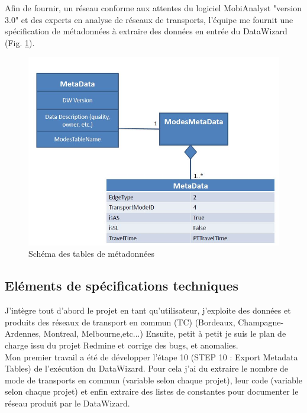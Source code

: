 \begin{itemize}
Afin de fournir, un réseau conforme aux attentes du logiciel MobiAnalyst "version 3.0" et des experts en analyse de réseaux de transports, l'équipe me fournit une spécification de métadonnées à extraire des données en entrée du DataWizard (Fig. \ref{DW_Metadata}).\\

\begin{figure}[!h]
\centering
\includegraphics[width=14cm]{images/DW_specMetadata.JPG}
\caption{\label{DW_Metadata}Schéma des tables de métadonnées}
\end{figure} 

\subsection{Eléments de spécifications techniques}

J'intègre tout d'abord le projet en tant qu'utilisateur, j'exploite des données et produits des réseaux de transport en commun (TC) (Bordeaux, Champagne-Ardennes, Montreal, Melbourne,etc...) Ensuite, petit à petit je suis le plan de charge issu du projet Redmine et corrige des bugs, et anomalies.\\

Mon premier travail a été de développer l'étape 10 (STEP 10 : Export Metadata Tables) de l'exécution du DataWizard. Pour cela j'ai du extraire le nombre de mode de transports en commun (variable selon chaque projet), leur code (variable selon chaque projet) et enfin extraire des listes de constantes pour documenter le réseau produit par le DataWizard.\\


\end{itemize}
